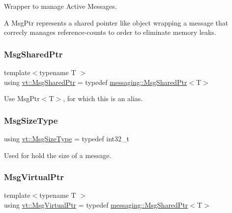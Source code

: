 Wrapper to manage Active Messages. 

A Msg\+Ptr represents a \textquotesingle{}shared pointer like\textquotesingle{} object wrapping a message that correcly manages reference-\/counts to order to eliminate memory leaks. \mbox{\label{namespacevt_ab2b3d506ec8e8d1540aede826d84a239}} 
\subsubsection{\texorpdfstring{Msg\+Shared\+Ptr}{MsgSharedPtr}}
{\footnotesize\ttfamily template$<$typename T $>$ \\
using \hyperlink{namespacevt_ab2b3d506ec8e8d1540aede826d84a239}{vt\+::\+Msg\+Shared\+Ptr} = typedef \hyperlink{structvt_1_1messaging_1_1_msg_shared_ptr}{messaging\+::\+Msg\+Shared\+Ptr}$<$T$>$}

Use {\ttfamily Msg\+Ptr$<$\+T$>$}, for which this is an alias. \mbox{\label{namespacevt_abfa009d900299ac1df967b40ea8f2c8a}} 
\subsubsection{\texorpdfstring{Msg\+Size\+Type}{MsgSizeType}}
{\footnotesize\ttfamily using \hyperlink{namespacevt_abfa009d900299ac1df967b40ea8f2c8a}{vt\+::\+Msg\+Size\+Type} = typedef int32\+\_\+t}



Used for hold the size of a message. 

\mbox{\label{namespacevt_a82b5c92ea7ca3ddd2e8a2e27df87fa1a}} 
\subsubsection{\texorpdfstring{Msg\+Virtual\+Ptr}{MsgVirtualPtr}}
{\footnotesize\ttfamily template$<$typename T $>$ \\
using \hyperlink{namespacevt_a82b5c92ea7ca3ddd2e8a2e27df87fa1a}{vt\+::\+Msg\+Virtual\+Ptr} = typedef \hyperlink{structvt_1_1messaging_1_1_msg_shared_ptr}{messaging\+::\+Msg\+Shared\+Ptr}$<$T$>$}

